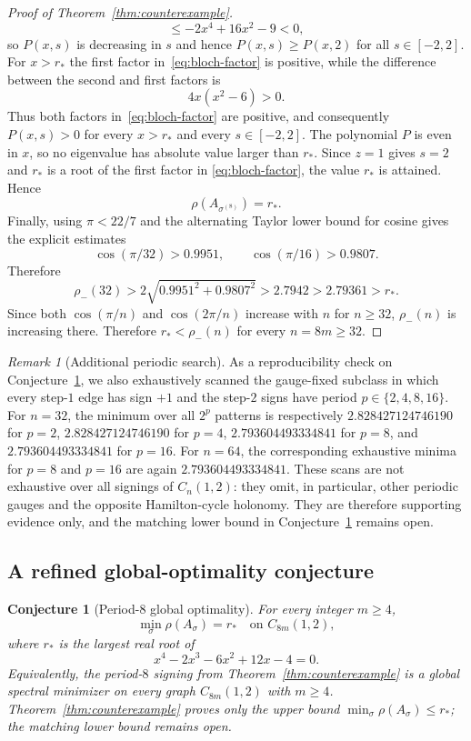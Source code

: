 \documentclass[11pt]{article}
\newtheorem{conjecture}[lemma]{Conjecture}
\theoremstyle{remark}
\newtheorem{remark}[lemma]{Remark}
\newcommand{\rhomax}{\rho}
\begin{document}
\begin{proof}[Proof of Theorem~\ref{thm:counterexample}]
\[\le -2x^4+16x^2-9<0,
\]
so $P(x,s)$ is decreasing in $s$ and hence
$P(x,s)\ge P(x,2)$ for all $s\in[-2,2]$. For $x>r_*$ the first
factor in~\eqref{eq:bloch-factor} is positive, while the difference between the second and
first factors is
\[
4x(x^2-6)>0.
\]
Thus both factors in~\eqref{eq:bloch-factor} are positive, and consequently
$P(x,s)>0$ for every $x>r_*$ and every $s\in[-2,2]$. The polynomial
$P$ is even in $x$, so no eigenvalue has absolute value larger than
$r_*$. Since $z=1$ gives $s=2$ and $r_*$ is a root of the first factor
in \eqref{eq:bloch-factor}, the value $r_*$ is attained. Hence
\[
\rhomax(A_{\sigma^{(8)}})=r_*.
\]
Finally, using $\pi<22/7$ and the alternating Taylor lower bound for cosine gives the
explicit estimates
\[
\cos(\pi/32)>0.9951,
\qquad
\cos(\pi/16)>0.9807.
\]
Therefore
\[
\rho_-(32)
>2\sqrt{0.9951^2+0.9807^2}
>2.7942>2.79361>r_*.
\]
Since both $\cos(\pi/n)$ and $\cos(2\pi/n)$ increase with $n$ for $n\ge32$,
$\rho_-(n)$ is increasing there. Therefore $r_*<\rho_-(n)$ for every $n=8m\ge32$.
\end{proof}

\begin{remark}[Additional periodic search]
As a reproducibility check on Conjecture~\ref{conj:period8}, we also exhaustively scanned
the gauge-fixed subclass in which every step-$1$ edge has sign $+1$ and the step-$2$
signs have period $p\in\{2,4,8,16\}$. For $n=32$, the minimum over all $2^p$
patterns is respectively
$2.828427124746190$ for $p=2$, $2.828427124746190$ for $p=4$,
$2.793604493334841$ for $p=8$, and $2.793604493334841$ for $p=16$.
For $n=64$, the corresponding exhaustive minima for $p=8$ and $p=16$ are again
$2.793604493334841$. These scans are not exhaustive over all signings of $C_n(1,2)$:
they omit, in particular, other periodic gauges and the opposite Hamilton-cycle
holonomy. They are therefore supporting evidence only, and the matching lower bound
in Conjecture~\ref{conj:period8} remains open.
\end{remark}

\subsection{A refined global-optimality conjecture}

\begin{conjecture}[Period-$8$ global optimality]\label{conj:period8}
For every integer $m\ge4$,
\[
\boxed{\min_\sigma\rhomax(A_\sigma)=r_*
\quad\text{on }C_{8m}(1,2),}
\]
where $r_*$ is the largest real root of
\[
x^4-2x^3-6x^2+12x-4=0.
\]
Equivalently, the period-$8$ signing from Theorem~\ref{thm:counterexample}
is a global spectral minimizer on every graph $C_{8m}(1,2)$ with $m\ge4$.
Theorem~\ref{thm:counterexample} proves only the upper bound
$\min_\sigma\rhomax(A_\sigma)\le r_*$; the matching lower bound remains
open.
\end{conjecture}
\end{document}
